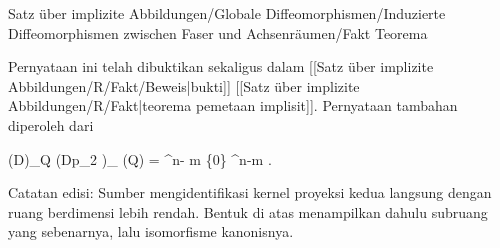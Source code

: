 {Satz über implizite Abbildungen/Globale Diffeomorphismen/Induzierte Diffeomorphismen zwischen Faser und Achsenräumen/Fakt}
{Teorema}
{}
{

\faktzusatz {}
\faktzusatz {}

}
{

Pernyataan ini telah dibuktikan sekaligus dalam [[Satz über implizite Abbildungen/R/Fakt/Beweis|bukti]]
[[Satz über implizite Abbildungen/R/Fakt|teorema pemetaan implisit]].
Pernyataan tambahan diperoleh dari

\mavergleichskettedisp
{\vergleichskette
{   \left(D\varphi\right)_{Q}
}
{ \cong} {   \left(Dp_2 \right)_{ \theta(Q)}
}
{ =} { \R^{n- m } \times \{0\} \cong \R^{n-m}
}
{ } {
}
{ } {
}
}
{}{}{.}

Catatan edisi: Sumber mengidentifikasi kernel proyeksi kedua langsung dengan ruang berdimensi lebih rendah. Bentuk di atas menampilkan dahulu subruang yang sebenarnya, lalu isomorfisme kanonisnya.

}

